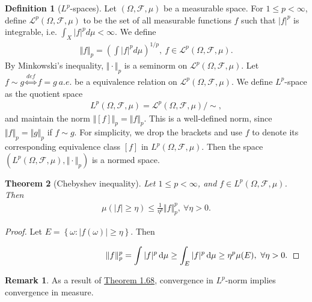 \documentclass{article}
\numberwithin{equation}{section}
\renewcommand{\d}{\mathrm{d}}
\theoremstyle{plain}
\newtheorem{theorem}{Theorem}[section]
\theoremstyle{definition}
\newtheorem{definition}[theorem]{Definition}
\newtheorem*{remark}{Remark}
\begin{document}
\begin{definition}[$L^p$-spaces]\label{def:1.67} Let $(\Omega,\mathscr{F},\mu)$ be a measurable space. For $1\leq p<\infty$, define $\mathcal{L}^p(\Omega,\mathscr{F},\mu)$ to be the set of all measurable functions $f$ such that $\vert f\vert^p$ is integrable, i.e. $\int_X\vert f\vert^p d\mu < \infty$. We define
\begin{align*}
	\Vert f\Vert_p = \left(\int\vert f\vert^p d\mu\right)^{1/p},\ f\in\mathcal{L}^p(\Omega,\mathscr{F},\mu).
\end{align*}
By Minkowski's inequality, $\Vert\cdot\Vert_p$ is a seminorm on $\mathcal{L}^p(\Omega,\mathscr{F},\mu)$.  Let $f\sim g\overset{def}{\Leftrightarrow} f=g\ a.e.$ be a equivalence relation on $\mathcal{L}^p(\Omega,\mathscr{F},\mu)$. We define $L^p$-space as the quotient space
\begin{align*}
	L^p(\Omega,\mathscr{F},\mu)=\mathcal{L}^p(\Omega,\mathscr{F},\mu)/\sim,
\end{align*} 
and maintain the norm $\Vert[f]\Vert_p=\Vert f\Vert_p$. This is a well-defined norm, since $\Vert f\Vert_p = \Vert g\Vert_p$ if $f\sim g$. For simplicity, we drop the brackets and use $f$ to denote its corresponding equivalence class $[f]$ in $L^p(\Omega,\mathscr{F},\mu)$. Then the space $(L^p(\Omega,\mathscr{F},\mu),\Vert\cdot\Vert_p)$ is a normed space.
\end{definition}

\begin{theorem}[Chebyshev inequality]\label{thm:1.68} Let $1\leq p<\infty$, and $f\in L^p(\Omega,\mathscr{F},\mu)$. Then
\begin{align*}
	\mu(\vert f\vert\geq\eta)\leq \frac{1}{\eta^p}\Vert f\Vert_p^p,\ \forall\eta>0.
\end{align*}
\end{theorem}
\begin{proof}
Let $E=\left\{\omega:\vert f(\omega)\vert\geq\eta\right\}$. Then \vspace{0.35cm}

$\displaystyle\hspace{4.2cm}\Vert f\Vert_p^p = \int \vert f\vert^p\,\d \mu\geq\int_E\vert f\vert^p\,\d \mu \geq \eta^p\mu(E),\ \forall \eta>0.\vspace{0.2cm}$
\end{proof}

\begin{remark}
As a result of \hyperref[thm:1.68]{Theorem 1.68}, convergence in $L^p$-norm implies convergence in measure.
\end{remark}
\end{document}
